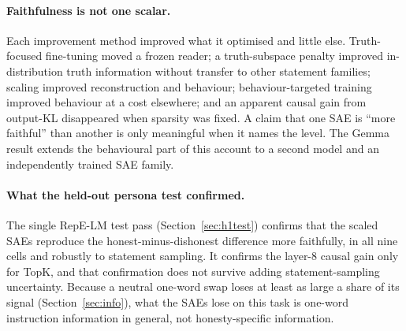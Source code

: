\paragraph{Faithfulness is not one scalar.} Each improvement method improved what it optimised and little else.
Truth-focused fine-tuning moved a frozen reader; a truth-subspace penalty improved in-distribution truth information
without transfer to other statement families; scaling improved reconstruction and behaviour; behaviour-targeted
training improved behaviour at a cost elsewhere; and an apparent causal gain from output-KL disappeared when sparsity was
fixed. A claim that one SAE is ``more faithful'' than another is only meaningful when it names the level. The Gemma
result extends the behavioural part of this account to a second model and an independently trained SAE family.

\paragraph{What the held-out persona test confirmed.} The single RepE-LM test pass (Section~\ref{sec:h1test}) confirms
that the scaled SAEs reproduce the honest-minus-dishonest difference more faithfully, in all nine cells and robustly to
statement sampling. It confirms the layer-8 causal gain only for TopK, and that confirmation does not survive adding
statement-sampling uncertainty. Because a neutral one-word swap loses at least as large a share of its signal
(Section~\ref{sec:info}), what the SAEs lose on this task is one-word instruction information in general, not
honesty-specific information.

